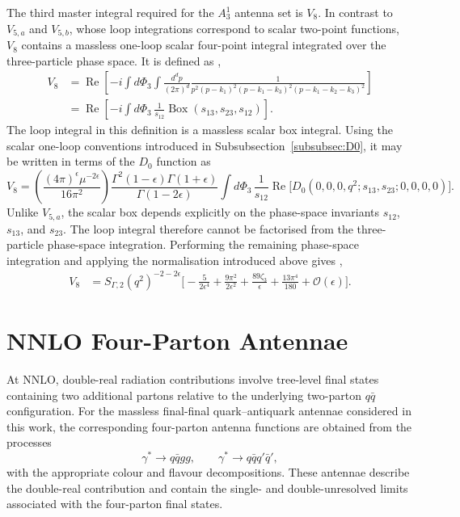 The third master integral required for the $A_3^1$ antenna set is $V_8$. In contrast to
$V_{5,a}$ and $V_{5,b}$, whose loop integrations correspond to scalar two-point functions,
$V_8$ contains a massless one-loop scalar four-point integral integrated over the
three-particle phase space. It is defined as \cite{Gehrmann-DeRidder:2005btv},
\begin{equation}
    \begin{split}
        V_8 &= \operatorname{Re}\!\left[-i\int d\Phi_3\int\frac{d^dp}{(2\pi)^d}\frac1{p^2(p-k_1)^2(p-k_1-k_3)^2(p-k_1-k_2-k_3)^2}\right]\\
            &= \operatorname{Re}\!\left[-i\int d\Phi_3\,\frac1{s_{12}}\operatorname{Box}(s_{13}, s_{23}, s_{12})\right].
    \end{split}
\end{equation}
The loop integral in this definition is a massless scalar box integral. Using the scalar
one-loop conventions introduced in Subsubsection~\ref{subsubsec:D0}, it may be written in
terms of the $D_0$ function as
\begin{equation}
    V_8 = \left(\frac{(4\pi)^\epsilon\mu^{-2\epsilon}}{16\pi^2}\right)\frac{\Gamma^2(1-\epsilon)\Gamma(1+\epsilon)}{\Gamma(1-2\epsilon)}\int d\Phi_3\,\frac1{s_{12}}\operatorname{Re}\Big[D_0\!\left(0,0,0,q^2;s_{13},s_{23};0,0,0,0\right)\Big].
\end{equation}
Unlike $V_{5,a}$, the scalar box depends explicitly on the phase-space invariants $s_{12}$,
$s_{13}$, and $s_{23}$. The loop integral therefore cannot be factorised from the
three-particle phase-space integration. Performing the remaining phase-space integration and
applying the normalisation introduced above gives \cite{Gehrmann-DeRidder:2005btv},
\begin{equation}
    \begin{split}
        V_8 &= S_{\Gamma,2}\!\left(q^2\right)^{-2-2\epsilon}\Big[-\frac5{2\epsilon^4}+\frac{9\pi^2}{2\epsilon^2}+\frac{89\zeta_3}{\epsilon}+\frac{13\pi^4}{180}+\mathcal O(\epsilon)\Big].
    \end{split}
\end{equation}

\section{NNLO Four-Parton Antennae}

At NNLO, double-real radiation contributions involve tree-level final states
containing two additional partons relative to the underlying two-parton $q\bar q$
configuration. For the massless final-final quark--antiquark antennae considered in
this work, the corresponding four-parton antenna functions are obtained from the
processes
\begin{equation*}
    \gamma^*\rightarrow q\bar qgg,\qquad
    \gamma^*\rightarrow q\bar q q'\bar q',
\end{equation*}
with the appropriate colour and flavour decompositions. These antennae describe the
double-real contribution and contain the single- and double-unresolved limits
associated with the four-parton final states.

